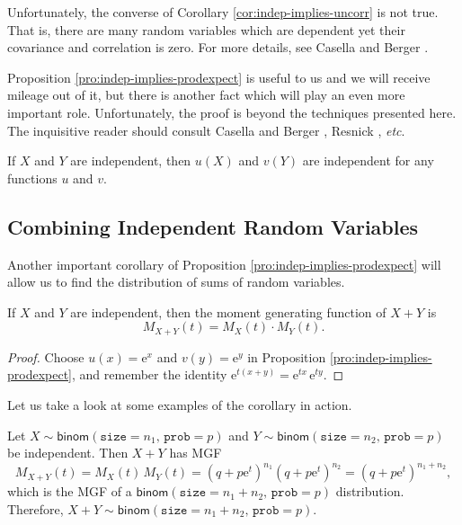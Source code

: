 \documentclass[captions=tableheading]{scrbook}
\begin{document}
\begin{rem}
\label{rem:cov0-not-imply-indep}
Unfortunately, the converse of Corollary \ref{cor:indep-implies-uncorr} is not true. That is, there are many random variables which are dependent yet their covariance and correlation is zero. For more details, see Casella and Berger \cite{Casella2002}.
\end{rem}

Proposition \ref{pro:indep-implies-prodexpect} is useful to us and we will receive mileage out of it, but there is another fact which will play an even more important role. Unfortunately, the proof is beyond the techniques presented here. The inquisitive reader should consult Casella and Berger \cite{Casella2002}, Resnick \cite{Resnick1999}, \emph{etc}.

\begin{fact}
\label{fac:indep-then-function-indep}
If \(X\) and \(Y\) are independent, then \(u(X)\) and \(v(Y)\) are independent for any functions \(u\) and \(v\).
\end{fact}
\subsection{Combining Independent Random Variables}
\label{sec-7-4-2}

\label{sub:Combining-Independent-Random}

Another important corollary of Proposition \ref{pro:indep-implies-prodexpect} will allow us to find the distribution of sums of random variables. 

\begin{cor}
If \(X\) and \(Y\) are independent, then the moment generating function of \(X+Y\) is 
\begin{equation}
M_{X+Y}(t)=M_{X}(t)\cdot M_{Y}(t).
\end{equation}
\end{cor}

\begin{proof}
Choose \(u(x)=\mathrm{e}^{x}\) and \(v(y)=\mathrm{e}^{y}\) in Proposition \ref{pro:indep-implies-prodexpect}, and remember the identity \(\mathrm{e}^{t(x+y)}=\mathrm{e}^{tx}\,\mathrm{e}^{ty}\).
\end{proof}

Let us take a look at some examples of the corollary in action.

\begin{example}
Let \(X\sim\mathsf{binom}(\mathtt{size}=n_{1},\,\mathtt{prob}=p)\) and \(Y\sim\mathsf{binom}(\mathtt{size}=n_{2},\,\mathtt{prob}=p)\) be independent. Then \(X+Y\) has MGF
\[
M_{X+Y}(t)=M_{X}(t)\, M_{Y}(t)=\left(q+p\mathrm{e}^{t}\right)^{n_{1}}\left(q+p\mathrm{e}^{t}\right)^{n_{2}}=\left(q+p\mathrm{e}^{t}\right)^{n_{1}+n_{2}},
\]
which is the MGF of a \(\mathsf{binom}(\mathtt{size}=n_{1}+n_{2},\,\mathtt{prob}=p)\) distribution. Therefore, \(X+Y\sim\mathsf{binom}(\mathtt{size}=n_{1}+n_{2},\,\mathtt{prob}=p)\).
\end{example}
\end{document}
